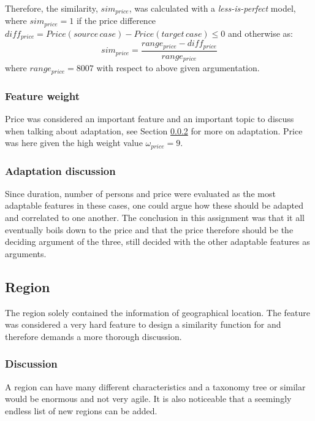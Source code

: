 \documentclass[12pt]{article}
\begin{document}
Therefore, the similarity, $sim_{price}$, was calculated with a \textit{less-is-perfect} model, where $sim_{price}=1$ if the price difference $diff_{price}=Price(source \, case) - Price(target \, case) \leq 0$ and otherwise as: $$sim_{price}=\frac{range_{price} - diff_{price}}{range_{price}}$$ where $range_{price}=8007$ with respect to above given argumentation. \cite{cbr}

\subsubsection{Feature weight}
\label{sec:price-weight}

Price was considered an important feature and an important topic to discuss when talking about adaptation, see Section \ref{sec:price-adapt} for more on adaptation. Price was here given the high weight value $\omega_{price}=9$.

\subsubsection{Adaptation discussion}
\label{sec:price-adapt}

Since duration, number of persons and price were evaluated as the most adaptable features in these cases, one could argue how these should be adapted and correlated to one another. The conclusion in this assignment was that it all eventually boils down to the price and that the price therefore should be the deciding argument of the three, still decided with the other adaptable features as arguments. 

\subsection{Region}
\label{sec:region}

The region solely contained the information of geographical location. The feature was considered a very hard feature to design a similarity function for and therefore demands a more thorough discussion.

\subsubsection{Discussion}
\label{sec:region-discussion}

A region can have many different characteristics and a taxonomy tree or similar would be enormous and not very agile. It is also noticeable that a seemingly endless list of new regions can be added. 
\end{document}
